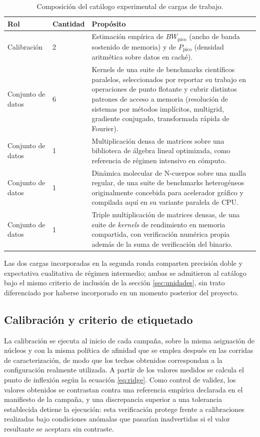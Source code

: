 \documentclass[12pt,oneside,spanish]{book}
\begin{document}
\begin{table}[H]
\centering
\caption[Composición del catálogo experimental]{Composición del catálogo experimental de cargas de trabajo.}
\label{tab:catalogo}
\begin{tabular}{@{}p{3.2cm}p{2.6cm}p{8.6cm}@{}}
\toprule
\textbf{Rol} & \textbf{Cantidad} & \textbf{Propósito} \\
\midrule
Calibración & 2 & Estimación empírica de $BW_{\text{pico}}$ (ancho de banda sostenido de memoria) y de $P_{\text{pico}}$ (densidad aritmética sobre datos en caché). \\
\addlinespace
Conjunto de datos & 6 & Kernels de una suite de benchmarks científicos paralelos, seleccionados por reportar su trabajo en operaciones de punto flotante y cubrir distintos patrones de acceso a memoria (resolución de sistemas por métodos implícitos, multigrid, gradiente conjugado, transformada rápida de Fourier). \\
\addlinespace
Conjunto de datos & 1 & Multiplicación densa de matrices sobre una biblioteca de álgebra lineal optimizada, como referencia de régimen intensivo en cómputo. \\
\addlinespace
Conjunto de datos & 1 & Dinámica molecular de N-cuerpos sobre una malla regular, de una suite de benchmarks heterogéneos originalmente concebida para acelerador gráfico y compilada aquí en su variante paralela de CPU. \\
\addlinespace
Conjunto de datos & 1 & Triple multiplicación de matrices densas, de una suite de \textit{kernels} de rendimiento en memoria compartida, con verificación numérica propia además de la suma de verificación del binario. \\
\bottomrule
\end{tabular}
\end{table}

Las dos cargas incorporadas en la segunda ronda comparten precisión doble y expectativa cualitativa de régimen intermedio; ambas se admitieron al catálogo bajo el mismo criterio de inclusión de la sección \ref{sec:unidades}, sin trato diferenciado por haberse incorporado en un momento posterior del proyecto.

\subsection{Calibración y criterio de etiquetado}

La calibración se ejecuta al inicio de cada campaña, sobre la misma asignación de núcleos y con la misma política de afinidad que se emplea después en las corridas de caracterización, de modo que los techos obtenidos correspondan a la configuración realmente utilizada. A partir de los valores medidos se calcula el punto de inflexión según la ecuación \eqref{eq:ridge}. Como control de validez, los valores obtenidos se contrastan contra una referencia empírica declarada en el manifiesto de la campaña, y una discrepancia superior a una tolerancia establecida detiene la ejecución: esta verificación protege frente a calibraciones realizadas bajo condiciones anómalas que pasarían inadvertidas si el valor resultante se aceptara sin contraste.
\end{document}
